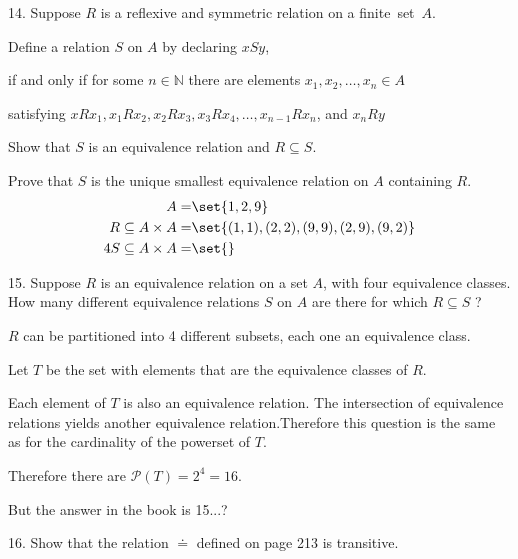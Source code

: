 \documentclass{hippoidC}
\begin{document}
\begin{prooflist}{14. Suppose $R$ is a reflexive and symmetric relation on a
		\mbox{finite set $A$.}}
	\item Define a relation $S$ on $A$ by declaring $x S y$,
	\item if and only if for some $n \in \mathbb{N}$ there are elements $x_1, x_2, \ldots, x_n \in A$
	\item satisfying $x R x_1, x_1 R x_2, x_2 R x_3, x_3 R x_4, \ldots, x_{n-1} R x_n$, and $x_n R y$
	\item Show that $S$ is an equivalence relation and $R \subseteq S$.
	\item Prove that $S$ is the unique smallest equivalence relation on $A$ containing $R$.
	\begin{align*}
		A=                     & \set{1, 2, 9}                                \\
		R\subseteq A\times A=  & \set{(1, 1), (2, 2), (9, 9), (2, 9), (9, 2)} \\
		4S\subseteq A\times A= & \set{}
	\end{align*}
\end{prooflist}

\begin{prooflist}{15. Suppose $R$ is an equivalence relation on a set $A$, with
		four equivalence classes. How many different equivalence relations $S$ on $A$
		are there for which $R \subseteq S$ ?}
	\item $R$ can be partitioned into 4 different subsets, each one an equivalence
	class.
	\item Let $T$ be the set with elements that are the equivalence classes of $R$.
	\item Each element of $T$ is also an equivalence relation. The
	intersection of equivalence relations yields another equivalence
	relation.Therefore this question is the same as for the cardinality of the
	powerset of $T$.
	\item Therefore there are $\mathscr{P}(T) = 2^4 = 16$.
	\item But the answer in the book is 15...?
\end{prooflist}

\begin{prooflist}{16. Show that the relation $\doteq$ defined on page 213 is
		transitive.} \item \end{prooflist}
\end{document}
